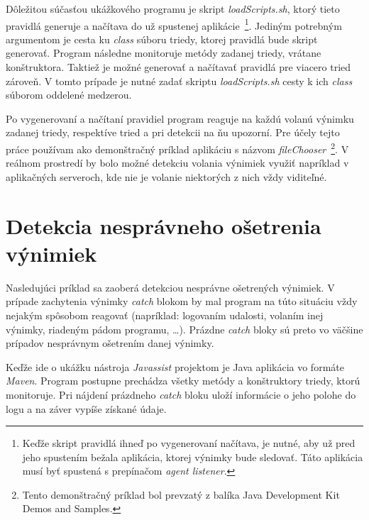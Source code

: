 \documentclass[11pt,final,oneside]{fithesis}
\begin{document}
Dôležitou súčasťou ukážkového programu je skript \textit{loadScripts.sh}, ktorý
tieto pravidlá generuje a načítava do už spustenej aplikácie~\footnote{Keďže 
skript pravidlá ihneď po vygenerovaní načítava, je nutné, aby už pred jeho 
spustením bežala aplikácia, ktorej výnimky bude sledovať. Táto aplikácia musí 
byť spustená s prepínačom \textit{agent listener}.}. Jediným 
potrebným argumentom je cesta ku \textit{class} súboru triedy, ktorej pravidlá 
bude skript generovať. Program následne monitoruje metódy zadanej triedy,
vrátane konštruktora. Taktiež je možné generovať a načítavať pravidlá
pre viacero tried zároveň. V tomto prípade je nutné zadať skriptu 
\textit{loadScripts.sh} cesty k ich \textit{class} súborom oddelené medzerou.

Po vygenerovaní a načítaní pravidiel program reaguje na každú volanú výnimku 
zadanej triedy, respektíve tried a pri detekcii na ňu upozorní. Pre účely tejto
práce používam ako demonštračný príklad aplikáciu s názvom 
\textit{fileChooser}~\footnote{Tento demonštračný príklad bol prevzatý z 
balíka Java Development Kit Demos and Samples.}. V reálnom prostredí by bolo 
možné detekciu volania výnimiek využiť napríklad v aplikačných serveroch, kde 
nie je volanie niektorých z nich vždy viditeľné.

\section{Detekcia nesprávneho ošetrenia výnimiek}
Nasledujúci príklad sa zaoberá detekciou nesprávne ošetrených výnimiek. V 
prípade zachytenia výnimky \textit{catch} blokom by mal program na túto 
situáciu vždy 
nejakým spôsobom reagovať (napríklad: logovaním udalosti, volaním inej výnimky,
riadeným pádom programu, …). Prázdne \textit{catch} bloky sú preto vo väčšine 
prípadov nesprávnym ošetrením danej výnimky.

Keďže ide o ukážku nástroja
\textit{Javassist} projektom je Java aplikácia vo formáte \textit{Maven}. 
Program postupne prechádza všetky metódy a konštruktory triedy, ktorú
monitoruje. Pri nájdení prázdneho \textit{catch} bloku uloží informácie o jeho
polohe do logu a na záver vypíše získané údaje.
\end{document}
